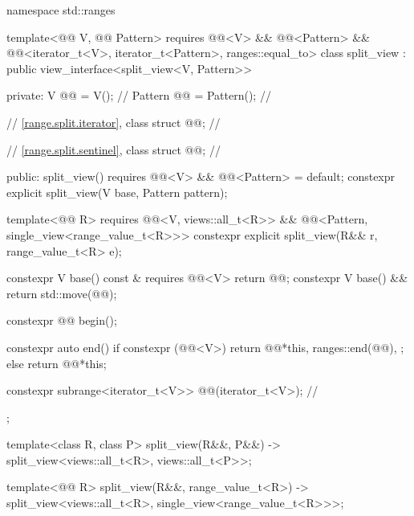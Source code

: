 \begin{codeblock}
namespace std::ranges {
  template<@@ V, @@ Pattern>
    requires @@<V> && @@<Pattern> &&
             @@<iterator_t<V>, iterator_t<Pattern>, ranges::equal_to>
  class split_view : public view_interface<split_view<V, Pattern>> {
  private:
    V @@ = V();                              // \expos
    Pattern @@ = Pattern();               // \expos

    // \ref{range.split.iterator}, class 
    struct @@;                            // \expos

    // \ref{range.split.sentinel}, class 
    struct @@;                            // \expos

  public:
    split_view()
      requires @@<V> && @@<Pattern> = default;
    constexpr explicit split_view(V base, Pattern pattern);

    template<@@ R>
      requires @@<V, views::all_t<R>> &&
               @@<Pattern, single_view<range_value_t<R>>>
    constexpr explicit split_view(R&& r, range_value_t<R> e);

    constexpr V base() const & requires @@<V> { return @@; }
    constexpr V base() && { return std::move(@@); }

    constexpr @@ begin();

    constexpr auto end() {
      if constexpr (@@<V>) {
        return @@{*this, ranges::end(@@), {}};
      } else {
        return @@{*this};
      }
    }

    constexpr subrange<iterator_t<V>> @@(iterator_t<V>); // \expos
  };

  template<class R, class P>
    split_view(R&&, P&&) -> split_view<views::all_t<R>, views::all_t<P>>;

  template<@@ R>
    split_view(R&&, range_value_t<R>)
      -> split_view<views::all_t<R>, single_view<range_value_t<R>>>;
}
\end{codeblock}

